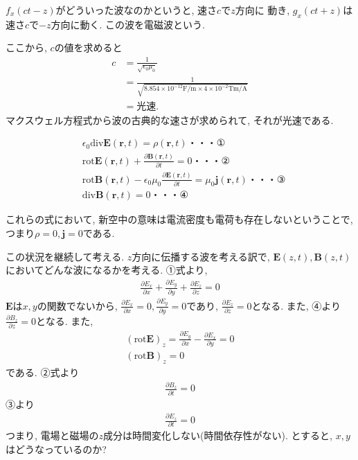 \documentclass[a4paper,12pt]{jlreq}
\begin{document}
$f_x (ct - z)$がどういった波なのかというと, 速さ$c$で$z$方向に
動き, $g_x (ct + z)$は速さ$c$で$-z$方向に動く. この波を電磁波という. \par

ここから, $c$の値を求めると
\begin{align}
  c &= \frac{1}{\sqrt{\epsilon_0 \mu_0}} \\
  &= \frac{1}{\sqrt{8.854 \times 10^{-12}\text{F/m} \times 4 \times 10^{-2} \text{Tm/A}}}\\
  &= 光速.
\end{align}
マクスウェル方程式から波の古典的な速さが求められて, それが光速である. \par

\newpage

\begin{align}
  &\epsilon_0 \text{div}\bm{E}(\bm{r},t) = \rho(\bm{r},t)　・・・①\\
  &\text{rot} \bm{E}(\bm{r},t) + \frac{\partial \bm{B}(\bm{r},t)}{\partial t} = 0　・・・②\\
  &\text{rot} \bm{B}(\bm{r},t) - \epsilon_0 \mu_0 \frac{\partial \bm{E}(\bm{r},t)}{\partial t} = \mu_0 \bm{j}(\bm{r},t)　・・・③\\
  &\text{div} \bm{B}(\bm{r},t) = 0　・・・④
\end{align}

これらの式において, 新空中の意味は電流密度も電荷も存在しないということで, 
つまり$\rho = 0, \bm{j} = 0$である. \par

この状況を継続して考える. $z$方向に伝播する波を考える訳で, 
$\bm{E}(z,t), \bm{B}(z,t)$においてどんな波になるかを考える. 
①式より, 
\begin{align}
  \frac{\partial E_x}{\partial x} + \frac{\partial E_y}{\partial y} + \frac{\partial E_z}{\partial z} = 0
\end{align}
$\bm{E}$は$x,y$の関数でないから, $\frac{\partial E_x}{\partial x} = 0,  \frac{\partial E_y}{\partial y} = 0 $であり, 
$\frac{\partial E_z}{\partial z} = 0$となる. また, ④より
$\frac{\partial B_z}{\partial z} = 0$となる. また, 
\begin{align}
  (\text{rot} \bm{E})_z = \frac{\partial E_y}{\partial x} - \frac{\partial E_x}{\partial y} = 0\\
  (\text{rot} \bm{B})_z = 0
\end{align}
である. ②式より
\begin{align}
  \frac{\partial B_z}{\partial t} = 0
\end{align}
③より
\begin{align}
  \frac{\partial E_z}{\partial t} = 0
\end{align}
つまり, 電場と磁場の$z$成分は時間変化しない(時間依存性がない). とすると, $x,y$はどうなっているのか?
\par
\end{document}
